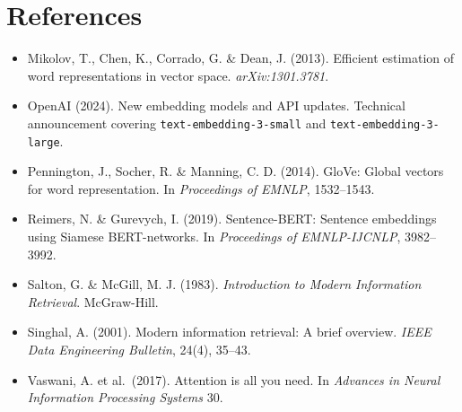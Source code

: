 \documentclass[11pt]{article}
\begin{document}
\section*{References}

\begin{itemize}[leftmargin=2em,itemsep=0.2em]
\item Mikolov, T., Chen, K., Corrado, G. \& Dean, J. (2013). Efficient estimation of word representations in vector space. \emph{arXiv:1301.3781}.
\item OpenAI (2024). New embedding models and API updates. Technical announcement covering \texttt{text-embedding-3-small} and \texttt{text-embedding-3-large}.
\item Pennington, J., Socher, R. \& Manning, C. D. (2014). GloVe: Global vectors for word representation. In \emph{Proceedings of EMNLP}, 1532--1543.
\item Reimers, N. \& Gurevych, I. (2019). Sentence-BERT: Sentence embeddings using Siamese BERT-networks. In \emph{Proceedings of EMNLP-IJCNLP}, 3982--3992.
\item Salton, G. \& McGill, M. J. (1983). \emph{Introduction to Modern Information Retrieval}. McGraw-Hill.
\item Singhal, A. (2001). Modern information retrieval: A brief overview. \emph{IEEE Data Engineering Bulletin}, 24(4), 35--43.
\item Vaswani, A. et al.\ (2017). Attention is all you need. In \emph{Advances in Neural Information Processing Systems} 30.
\end{itemize}
\end{document}
